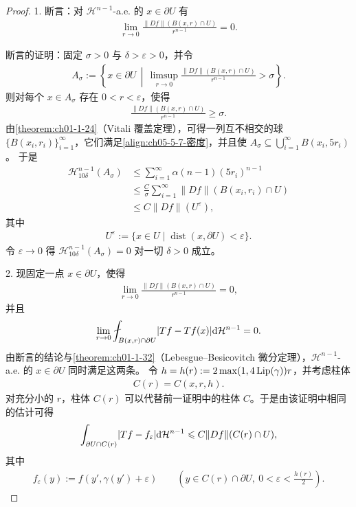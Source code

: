 \documentclass[../../main.tex]{subfiles}%
\begin{document}
\begin{proof}
1. 断言：对 $\mathcal{H}^{n-1}$-a.e. 的 $x\in\partial U$ 有
\begin{align*}
\lim_{r\to0}\frac{\lVert Df\rVert(B(x,r)\cap U)}{r^{n-1}}=0.
\end{align*}

断言的证明：固定 $\sigma>0$ 与 $\delta>\varepsilon>0$，并令
\begin{align*}
A_\sigma:=\left\{x\in\partial U\,\middle|\,\limsup_{r\to0}\frac{\lVert Df\rVert(B(x,r)\cap U)}{r^{n-1}}>\sigma\right\}.
\end{align*}
则对每个 $x\in A_\sigma$ 存在 $0<r<\varepsilon$，使得
\begin{align}
\frac{\lVert Df\rVert(B(x,r)\cap U)}{r^{n-1}}\geqslant\sigma.\label{align:ch05-5-7-密度}
\end{align}
由\cref{theorem:ch01-1-24}（Vitali 覆盖定理），可得一列互不相交的球 $\{B(x_i,r_i)\}_{i=1}^{\infty}$，它们满足\eqref{align:ch05-5-7-密度}，并且使 $A_\sigma\subseteq\bigcup_{i=1}^{\infty}B(x_i,5r_i)$。%
于是
\begin{align*}
\mathcal{H}^{n-1}_{10\delta}(A_\sigma)&\leqslant\sum_{i=1}^{\infty}\alpha(n-1)(5r_i)^{n-1}\\
&\leqslant\frac{C}{\sigma}\sum_{i=1}^{\infty}\lVert Df\rVert(B(x_i,r_i)\cap U)\\
&\leqslant C\lVert Df\rVert(U^{\varepsilon}),
\end{align*}
其中
\begin{align*}
U^{\varepsilon}:=\{x\in U\mid\operatorname{dist}(x,\partial U)<\varepsilon\}.
\end{align*}
令 $\varepsilon\to0$ 得 $\mathcal{H}^{n-1}_{10\delta}(A_\sigma)=0$ 对一切 $\delta>0$ 成立。

2. 现固定一点 $x\in\partial U$，使得
\begin{align}
\lim_{r\to0}\frac{\lVert Df\rVert(B(x,r)\cap U)}{r^{n-1}}=0,\label{align:ch05-5-7-好点}
\end{align}
并且
\begin{align*}
\lim_{r\to0}\fint_{B(x,r)\cap\partial U}\lvert Tf-Tf(x)\rvert\diff\mathcal{H}^{n-1}=0.
\end{align*}
由断言的结论与\cref{theorem:ch01-1-32}（Lebesgue--Besicovitch 微分定理），$\mathcal{H}^{n-1}$-a.e. 的 $x\in\partial U$ 同时满足这两条。%
令 $h=h(r):=2\max(1,4\operatorname{Lip}(\gamma))r$，并考虑柱体
\begin{align*}
C(r)=C(x,r,h).
\end{align*}
对充分小的 $r$，柱体 $C(r)$ 可以代替前一证明中的柱体 $C$。于是由该证明中相同的估计可得
\begin{align*}
\int_{\partial U\cap C(r)}\lvert Tf-f_{\varepsilon}\rvert\mathrm{d}\mathcal{H}^{n-1}\leqslant C\lVert Df\rVert(C(r)\cap U),
\end{align*}
其中
\begin{align*}
f_{\varepsilon}(y):=f(y',\gamma(y')+\varepsilon)\qquad\left(y\in C(r)\cap\partial U,\ 0<\varepsilon<\frac{h(r)}{2}\right).
\end{align*}


\end{proof}
\end{document}
